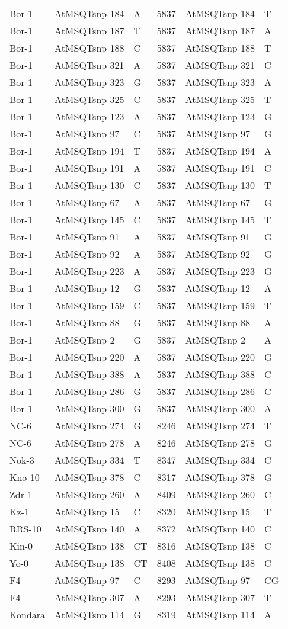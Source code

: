 \begin{center}
\begin{longtable}{|l|l|l|l|l|l|}
Bor-1&AtMSQTsnp 184&A&5837&AtMSQTsnp 184&T\\
Bor-1&AtMSQTsnp 187&T&5837&AtMSQTsnp 187&A\\
Bor-1&AtMSQTsnp 188&C&5837&AtMSQTsnp 188&T\\
Bor-1&AtMSQTsnp 321&A&5837&AtMSQTsnp 321&C\\
Bor-1&AtMSQTsnp 323&G&5837&AtMSQTsnp 323&A\\
Bor-1&AtMSQTsnp 325&C&5837&AtMSQTsnp 325&T\\
Bor-1&AtMSQTsnp 123&A&5837&AtMSQTsnp 123&G\\
Bor-1&AtMSQTsnp 97&C&5837&AtMSQTsnp 97&G\\
Bor-1&AtMSQTsnp 194&T&5837&AtMSQTsnp 194&A\\
Bor-1&AtMSQTsnp 191&A&5837&AtMSQTsnp 191&C\\
Bor-1&AtMSQTsnp 130&C&5837&AtMSQTsnp 130&T\\
Bor-1&AtMSQTsnp 67&A&5837&AtMSQTsnp 67&G\\
Bor-1&AtMSQTsnp 145&C&5837&AtMSQTsnp 145&T\\
Bor-1&AtMSQTsnp 91&A&5837&AtMSQTsnp 91&G\\
Bor-1&AtMSQTsnp 92&A&5837&AtMSQTsnp 92&G\\
Bor-1&AtMSQTsnp 223&A&5837&AtMSQTsnp 223&G\\
Bor-1&AtMSQTsnp 12&G&5837&AtMSQTsnp 12&A\\
Bor-1&AtMSQTsnp 159&C&5837&AtMSQTsnp 159&T\\
Bor-1&AtMSQTsnp 88&G&5837&AtMSQTsnp 88&A\\
Bor-1&AtMSQTsnp 2&G&5837&AtMSQTsnp 2&A\\
Bor-1&AtMSQTsnp 220&A&5837&AtMSQTsnp 220&G\\
Bor-1&AtMSQTsnp 388&A&5837&AtMSQTsnp 388&C\\
Bor-1&AtMSQTsnp 286&G&5837&AtMSQTsnp 286&C\\
Bor-1&AtMSQTsnp 300&G&5837&AtMSQTsnp 300&A\\
NC-6&AtMSQTsnp 274&G&8246&AtMSQTsnp 274&T\\
NC-6&AtMSQTsnp 278&A&8246&AtMSQTsnp 278&G\\
Nok-3&AtMSQTsnp 334&T&8347&AtMSQTsnp 334&C\\
Kno-10&AtMSQTsnp 378&C&8317&AtMSQTsnp 378&G\\
Zdr-1&AtMSQTsnp 260&A&8409&AtMSQTsnp 260&C\\
Kz-1&AtMSQTsnp 15&C&8320&AtMSQTsnp 15&T\\
RRS-10&AtMSQTsnp 140&A&8372&AtMSQTsnp 140&C\\
Kin-0&AtMSQTsnp 138&CT&8316&AtMSQTsnp 138&C\\
Yo-0&AtMSQTsnp 138&CT&8408&AtMSQTsnp 138&C\\
F4&AtMSQTsnp 97&C&8293&AtMSQTsnp 97&CG\\
F4&AtMSQTsnp 307&A&8293&AtMSQTsnp 307&T\\
Kondara&AtMSQTsnp 114&G&8319&AtMSQTsnp 114&A\\
\hline
\end{longtable}
\end{center}

